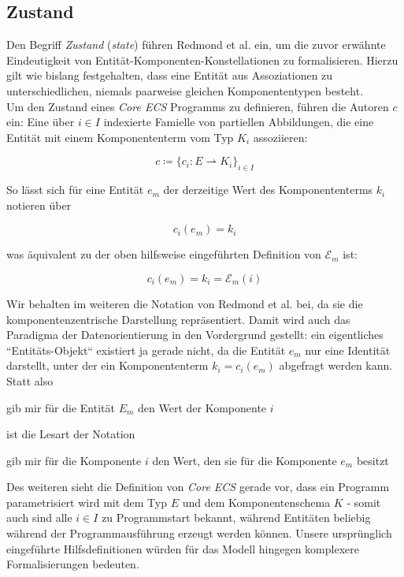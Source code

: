 \subsection{Zustand}
Den Begriff \textit{Zustand} (\textit{state}) führen Redmond et {al.} ein, um die zuvor erwähnte Eindeutigkeit von Entität-Komponenten-Konstellationen zu formalisieren.
Hierzu gilt wie bislang festgehalten, dass eine Entität aus Assoziationen zu unterschiedlichen, niemals paarweise gleichen Komponententypen besteht.\\

Um den Zustand eines \textit{Core ECS} Programms zu definieren, führen die Autoren $c$ ein: Eine über $i \in I$ indexierte Famielle von partiellen Abbildungen, die eine Entität mit einem Komponententerm vom Typ $K_i$ assoziieren:

\[
    c \coloneqq \{c_i : E \rightharpoonup K_i\}_{i \in I}
\]

\noindent
So lässt sich für eine Entität $e_m$ der derzeitige Wert des Komponententerms $k_i$ notieren über

\[
    c_i(e_m) = k_i
\]

\noindent
was äquivalent zu der oben hilfsweise eingeführten Definition von $\mathcal{E}_m$ ist:

\[
    c_i(e_m) = k_i = \mathcal{E}_m(i)
\]

\noindent
Wir behalten im weiteren die Notation von Redmond et {al.} bei, da sie die komponentenzentrische Darstellung repräsentiert.
Damit wird auch das Paradigma der Datenorientierung in den Vordergrund gestellt: ein eigentliches ``Entitäts-Objekt`` existiert ja gerade nicht, da die Entität $e_m$ nur eine Identität darstellt, unter der ein Komponententerm $k_i = c_i(e_m)$ abgefragt werden kann.\\

\noindent
Statt also

\begin{displayquote}
    gib mir für die Entität $E_m$ den Wert der Komponente $i$
\end{displayquote}

\noindent
ist die Lesart der Notation

\begin{displayquote}
    gib mir für die Komponente $i$ den Wert, den sie für die Komponente $e_m$ besitzt
\end{displayquote}

\noindent
Des weiteren sieht die Definition von \textit{Core ECS} gerade vor, dass ein Programm parametrisiert wird mit dem Typ $E$ und dem Komponentenschema $K$ - somit auch sind alle $i \in I$ zu Programmstart bekannt, während Entitäten beliebig während der Programmausführung erzeugt werden können.
Unsere ursprünglich eingeführte Hilfsdefinitionen würden für das Modell hingegen komplexere Formalisierungen bedeuten.
